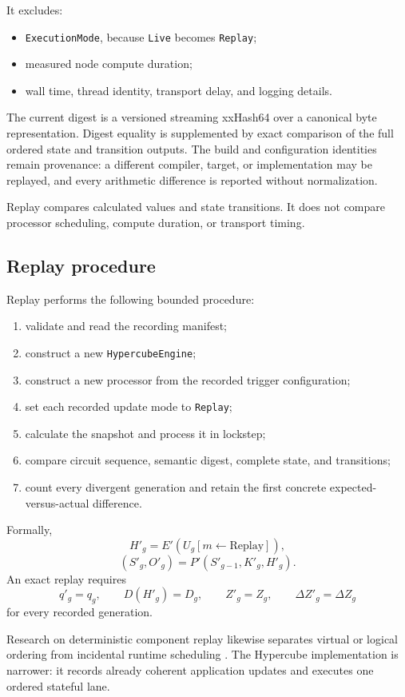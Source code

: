\documentclass{strategynet-journal}
\begin{document}
\begin{SNcolumns}
It excludes:
\begin{itemize}
  \item \texttt{ExecutionMode}, because \texttt{Live} becomes
        \texttt{Replay};
  \item measured node compute duration;
  \item wall time, thread identity, transport delay, and logging details.
\end{itemize}

The current digest is a versioned streaming xxHash64 over a canonical byte
representation.  Digest equality is supplemented by exact comparison of the
full ordered state and transition outputs.  The build and configuration
identities remain provenance: a different compiler, target, or implementation
may be replayed, and every arithmetic difference is reported without
normalization.

Replay compares calculated values and state transitions.  It does not compare
processor scheduling, compute duration, or transport timing.

\subsection{Replay procedure}

Replay performs the following bounded procedure:
\begin{enumerate}
  \item validate and read the recording manifest;
  \item construct a new \texttt{HypercubeEngine};
  \item construct a new processor from the recorded trigger configuration;
  \item set each recorded update mode to \texttt{Replay};
  \item calculate the snapshot and process it in lockstep;
  \item compare circuit sequence, semantic digest, complete state, and
        transitions;
  \item count every divergent generation and retain the first concrete
        expected-versus-actual difference.
\end{enumerate}

Formally,
\[
  H'_g=E'(U_g[m\leftarrow\mathrm{Replay}]),
\]
\[
  (S'_g,O'_g)=P'(S'_{g-1},K'_g,H'_g).
\]
An exact replay requires
\[
  q'_g=q_g,\qquad D(H'_g)=D_g,\qquad
  Z'_g=Z_g,\qquad\Delta Z'_g=\Delta Z_g
\]
for every recorded generation.

Research on deterministic component replay likewise separates virtual or
logical ordering from incidental runtime scheduling \cite{detreplay}.  The
Hypercube implementation is narrower: it records already coherent
application updates and executes one ordered stateful lane.


\end{SNcolumns}
\end{document}
